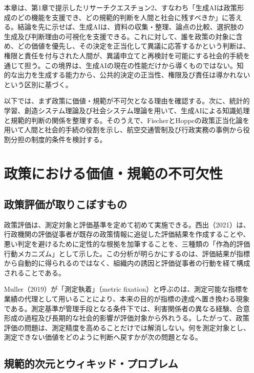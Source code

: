 本章は、第1章で提示したリサーチクエスチョン2、すなわち「生成AIは政策形成のどの機能を支援でき、どの規範的判断を人間と社会に残すべきか」に答える。結論を先に示せば、生成AIは、資料の収集・整理、論点の比較、選択肢の生成及び判断理由の可視化を支援できる。これに対して、誰を政策の対象に含め、どの価値を優先し、その決定を正当化して異議に応答するかという判断は、権限と責任を付与された人間が、異議申立てと再検討を可能にする社会的手続を通じて担う。この境界は、生成AIの現在の性能だけから導くものではない。知的な出力を生成する能力から、公共的決定の正当性、権限及び責任は導かれないという区別に基づく。

以下では、まず政策に価値・規範が不可欠となる理由を確認する。次に、統計的学習、創造システム理論及び社会システム理論を用いて、生成AIによる知識処理と規範的判断の関係を整理する。そのうえで、FischerとHoppeの政策正当化論を用いて人間と社会的手続の役割を示し、航空交通管制及び行政実務の事例から役割分担の制度的条件を検討する。

\section{政策における価値・規範の不可欠性}

\subsection{政策評価が取りこぼすもの}

政策評価は、測定対象と評価基準を定めて初めて実施できる。西出（2021）は、行政機関の評価従事者が既存の政策情報に追従した評価結果を作成することや、悪い判定を避けるために定性的な根拠を加筆することを、三種類の「作為的評価行動メカニズム」として示した\cite{nishide2021}。この分析が明らかにするのは、評価結果が指標から自動的に得られるのではなく、組織内の誘因と評価従事者の行動を経て構成されることである。

Muller（2019）が「測定執着」（metric fixation）と呼ぶのは、測定可能な指標を業績の代理として用いることにより、本来の目的が指標の達成へ置き換わる現象である\cite{muller2019}。測定基準が管理手段となる条件下では、利害関係者の異なる経験、合意形成の過程及び長期的な社会的影響が評価対象から外れうる。したがって、政策評価の問題は、測定精度を高めることだけでは解消しない。何を測定対象とし、測定できない価値をどのように判断へ戻すかが次の問題となる。

\subsection{規範的次元とウィキッド・プロブレム}

